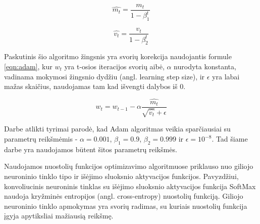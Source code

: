 \begin{equation}
\label{eqn:corr_m_t}
	\hat{m_t} = \dfrac{m_t}{1 - \beta_1^t}
\end{equation}

\begin{equation}
\label{eqn:corr_v_t}
	\hat{v_t} = \dfrac{v_t}{1 - \beta_2^t}
\end{equation}

Paskutinis šio algoritmo žingsnis yra svorių korekcija naudojantis formule \ref{eqn:adam}, kur $w_t$ yra t-osios iteracijos svorių aibė, $\alpha$ nurodyta konstanta, vadinama mokymosi žingsnio dydžiu (angl. learning step size), ir $\epsilon$ yra labai mažas skaičius, naudojamas tam kad išvengti dalybos iš 0.

\begin{equation}
\label{eqn:adam}
	w_t = w_{t-1} - \alpha \dfrac{\hat{m_t}}{\sqrt{\hat{v_t}} + \epsilon}
\end{equation}

Darbe \cite{adam} atlikti tyrimai parodė, kad Adam algoritmas veikia sparčiausiai su parametrų reikšmėmis - $\alpha = 0.001$, $\beta_1 = 0.9$, $\beta_2 = 0.999$ ir $\epsilon = 10^{-8}$. Tad šiame darbe yra naudojamos būtent šitos parametrų reikšmės.

Naudojamos nuostolių funkcijos optimizavimo algoritmuose priklauso nuo giliojo neuroninio tinklo tipo ir išėjimo sluoksnio aktyvacijos funkcijos. Pavyzdžiui, konvoliucinis neuroninis tinklas su išėjimo sluoksnio aktyvacijos funkcija SoftMax naudoja kryžminės entropijos (angl. cross-entropy) nuostolių funkciją. Giliojo neuroninio tinklo apmokymas yra svorių radimas, su kuriais nuostolių funkcija įgyja apytiksliai mažiausią reikšmę.
